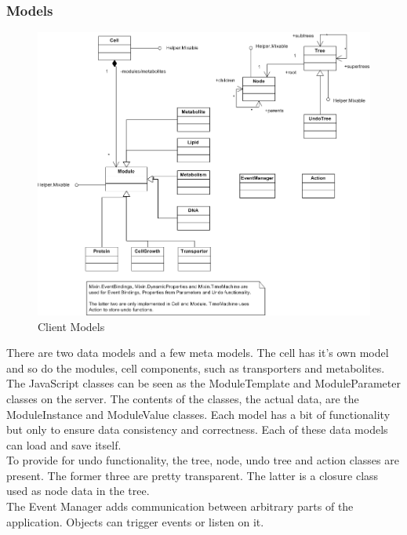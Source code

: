 \documentclass{report}
\begin{document}
				\subsubsection{Models}
					\begin{figure}[htb]
						\begin{center}
							\includegraphics[width=\linewidth]{models.png}
							\caption{Client Models}
							\label{fig: cmodels}
						\end{center}
					\end{figure}	
					There are two data models and a few meta models. The cell has it's own model and so do the modules, cell components, such as transporters and metabolites. The JavaScript classes can be seen as the ModuleTemplate and ModuleParameter classes on the server. The contents of the classes, the actual data, are the ModuleInstance and ModuleValue classes. Each model has a bit of functionality but only
					to ensure data consistency and correctness. Each of these data models can load and save itself. \\
					To provide for undo functionality, the tree, node, undo tree and action classes are present. The former three are pretty transparent. The latter is a closure class used as node data in the tree. \\
					The Event Manager adds communication between arbitrary parts of the application. Objects can trigger events or listen on it.
				
\end{document}
